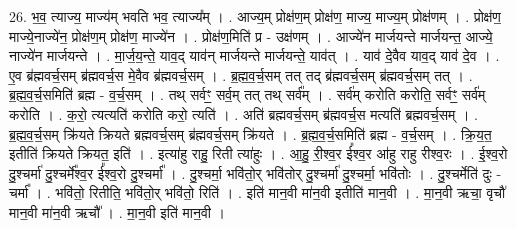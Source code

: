 \documentclass[17pt]{extarticle}
\begin{document}
26. भ॒व॒ त्याज्य॒ माज्य॑म् भवति भव॒ त्याज्य᳚म् । . आज्य॒म् प्रोक्ष॑ण॒म् प्रोक्ष॑ण॒ माज्य॒ माज्य॒म् प्रोक्ष॑णम् । . प्रोक्ष॑ण॒ माज्ये॒नाज्ये॑न॒ प्रोक्ष॑ण॒म् प्रोक्ष॑ण॒ माज्ये॑न । . प्रोक्ष॑ण॒मिति॑ प्र - उक्ष॑णम् । . आज्ये॑न मार्जयन्ते मार्जयन्त॒ आज्ये॒ नाज्ये॑न मार्जयन्ते । . मा॒र्ज॒य॒न्ते॒ याव॒द् याव॑न् मार्जयन्ते मार्जयन्ते॒ याव॑त् । . याव॑ दे॒वैव याव॒द् याव॑ दे॒व । . ए॒व ब्र॑ह्मवर्च॒सम् ब्र॑ह्मवर्च॒स मे॒वैव ब्र॑ह्मवर्च॒सम् । . ब्र॒ह्म॒व॒र्च॒सम् तत् तद् ब्र॑ह्मवर्च॒सम् ब्र॑ह्मवर्च॒सम् तत् । . ब्र॒ह्म॒व॒र्च॒समिति॑ ब्रह्म - व॒र्च॒सम् । . तथ् सर्वꣳ॒॒ सर्व॒म् तत् तथ् सर्व᳚म् । . सर्व॑म् करोति करोति॒ सर्वꣳ॒॒ सर्व॑म् करोति । . क॒रो॒ त्यत्यति॑ करोति करो॒ त्यति॑ । . अति॑ ब्रह्मवर्च॒सम् ब्र॑ह्मवर्च॒स मत्यति॑ ब्रह्मवर्च॒सम् । . ब्र॒ह्म॒व॒र्च॒सम् क्रि॑यते क्रियते ब्रह्मवर्च॒सम् ब्र॑ह्मवर्च॒सम् क्रि॑यते । . ब्र॒ह्म॒व॒र्च॒समिति॑ ब्रह्म - व॒र्च॒सम् । . क्रि॒य॒त॒ इतीति॑ क्रियते क्रियत॒ इति॑ । . इत्या॑हु राहु॒ रिती त्या॑हुः । . आ॒हु॒ री॒श्व॒र ई᳚श्व॒र आ॑हु राहु रीश्व॒रः । . ई॒श्व॒रो दु॒श्चर्मा॑ दु॒श्चर्मे᳚श्व॒र ई᳚श्व॒रो दु॒श्चर्मा᳚ । . दु॒श्चर्मा॒ भवि॑तो॒र् भवि॑तोर् दु॒श्चर्मा॑ दु॒श्चर्मा॒ भवि॑तोः । . दु॒श्चर्मेति॑ दुः - चर्मा᳚ । . भवि॑तो॒ रितीति॒ भवि॑तो॒र् भवि॑तो॒ रिति॑ । . इति॑ मान॒वी मा॑न॒वी इतीति॑ मान॒वी । . मा॒न॒वी ऋचा॒ वृचौ॑ मान॒वी मा॑न॒वी ऋचौ᳚ । . मा॒न॒वी इति॑ मान॒वी । \newline
\end{document}
